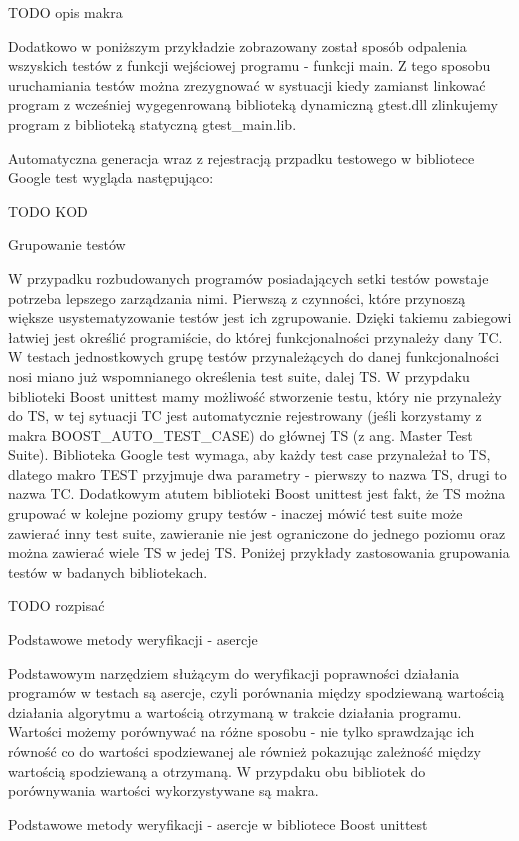 TODO opis makra

Dodatkowo w poniższym przykładzie zobrazowany został sposób odpalenia wszyskich testów z funkcji wejściowej programu - funkcji main. Z tego sposobu uruchamiania testów można zrezygnować w systuacji kiedy zamianst linkować program z wcześniej wygegenrowaną biblioteką dynamiczną gtest.dll zlinkujemy program z biblioteką statyczną gtest_main.lib.

Automatyczna generacja wraz z rejestracją przpadku testowego w bibliotece Google test wygląda następująco:

TODO KOD

Grupowanie testów

W przypadku rozbudowanych programów posiadających setki testów powstaje potrzeba lepszego zarządzania nimi. Pierwszą z czynności, które przynoszą większe usystematyzowanie testów jest ich zgrupowanie. Dzięki takiemu zabiegowi łatwiej jest określić programiście, do której funkcjonalności przynależy dany TC.
W testach jednostkowych grupę testów przynależących do danej funkcjonalności nosi miano już wspomnianego określenia test suite, dalej TS. 
W przypdaku biblioteki Boost unittest mamy możliwość stworzenie testu, który nie przynależy do TS, w tej sytuacji TC jest automatycznie rejestrowany (jeśli korzystamy z makra BOOST_AUTO_TEST_CASE) do głównej TS (z ang. Master Test Suite).
Biblioteka Google test wymaga, aby każdy test case przynależał to TS, dlatego makro TEST przyjmuje dwa parametry - pierwszy to nazwa TS, drugi to nazwa TC.
Dodatkowym atutem biblioteki Boost unittest jest fakt, że TS można grupować w kolejne poziomy grupy testów - inaczej mówić test suite może zawierać inny test suite, zawieranie nie jest ograniczone do jednego poziomu oraz można zawierać wiele TS w jedej TS.
Poniżej przykłady zastosowania grupowania testów w badanych bibliotekach.

TODO rozpisać

Podstawowe metody weryfikacji - asercje

Podstawowym narzędziem służącym do weryfikacji poprawności działania programów w testach są asercje, czyli porównania między spodziewaną wartością działania algorytmu a wartością otrzymaną w trakcie działania programu.
Wartości możemy porównywać na różne sposobu - nie tylko sprawdzając ich równość co do wartości spodziewanej ale również pokazując zależność między wartością spodziewaną a otrzymaną. W przypdaku obu bibliotek do porównywania wartości wykorzystywane są makra.

Podstawowe metody weryfikacji - asercje w bibliotece Boost unittest

